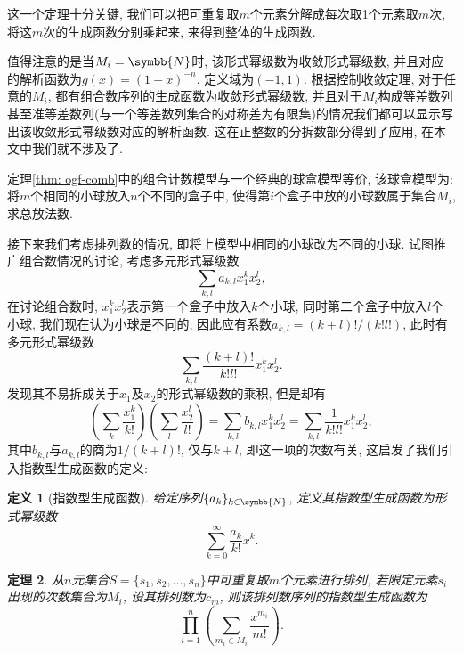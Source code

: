 \documentclass[chinese]{assignment}[2019/10/15]
\newcommand{\BN}{\symbb{N}}
\newcommand{\lr}[3]{\left#1#3\right#2}
\theoremstyle{plain}
\newtheorem{theorem}{定理}[section]
\newtheorem{definition}[theorem]{定义}
\begin{document}
    这一个定理十分关键, 我们可以把可重复取$m$个元素分解成每次取1个元素取$m$次, 将这$m$次的生成函数分别乘起来, 来得到整体的生成函数.

    值得注意的是当$M_{i}=\BN$时, 该形式幂级数为收敛形式幂级数, 并且对应的解析函数为$g(x) = (1-x)^{-n}$, 定义域为$(-1, 1)$. 根据控制收敛定理, 对于任意的$M_{i}$, 都有组合数序列的生成函数为收敛形式幂级数, 并且对于$M_i$构成等差数列甚至准等差数列(与一个等差数列集合的对称差为有限集)的情况我们都可以显示写出该收敛形式幂级数对应的解析函数. 这在正整数的分拆数部分得到了应用, 在本文中我们就不涉及了.

    定理\ref{thm: ogf-comb}中的组合计数模型与一个经典的球盒模型等价, 该球盒模型为: 将$m$个相同的小球放入$n$个不同的盒子中, 使得第$i$个盒子中放的小球数属于集合$M_i$, 求总放法数.

    接下来我们考虑排列数的情况, 即将上模型中相同的小球改为不同的小球. 试图推广组合数情况的讨论, 考虑多元形式幂级数
    \begin{equation}
        \sum_{k, l}a_{k, l}x_1^kx_2^l,
    \end{equation}
    在讨论组合数时, $x_1^kx_2^l$表示第一个盒子中放入$k$个小球, 同时第二个盒子中放入$l$个小球, 我们现在认为小球是不同的, 因此应有系数$a_{k, l} = (k+l)!/(k!l!)$, 此时有多元形式幂级数
    \begin{equation}
        \sum_{k, l}\frac{(k+l)!}{k!l!}x_1^kx_2^l.
    \end{equation}
    发现其不易拆成关于$x_1$及$x_2$的形式幂级数的乘积, 但是却有
    \begin{equation}
        \lr(){\sum_k\frac{x_1^k}{k!}}\lr(){\sum_l\frac{x_2^l}{l!}} = \sum_{k, l}b_{k, l}x_1^kx_2^l = \sum_{k, l}\frac{1}{k!l!}x_1^kx_2^l,
    \end{equation}
    其中$b_{k, l}$与$a_{k, l}$的商为$1/(k+l)!$, 仅与$k+l$, 即这一项的次数有关, 这启发了我们引入指数型生成函数的定义:

    \begin{definition}[指数型生成函数]
        给定序列$\{a_k\}_{k\in\BN}$, 定义其指数型生成函数为形式幂级数
        \begin{equation}
            \sum_{k=0}^\infty \frac{a_k}{k!}x^k.
        \end{equation}
    \end{definition}

    \begin{theorem}
        从$n$元集合$S = \{s_1, s_2, \dotsc, s_n\}$中可重复取$m$个元素进行排列, 若限定元素$s_i$出现的次数集合为$M_i$, 设其排列数为$c_m$, 则该排列数序列的指数型生成函数为
        \begin{equation}
            \prod_{i=1}^n\left(\sum_{m_i\in M_i}\frac{x^{m_i}}{m!}\right).
        \end{equation}
    \end{theorem}
\end{document}
